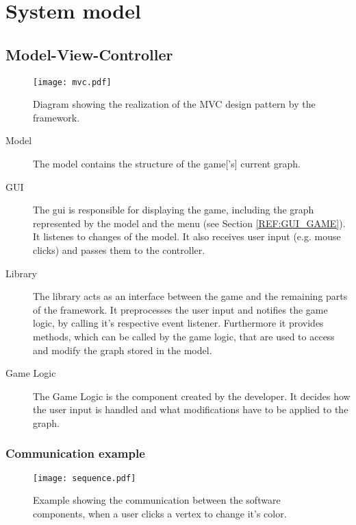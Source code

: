 \section{System model}

\subsection{Model-View-Controller}


\begin{figure}[h]
	\centering
	\texttt{[image: mvc.pdf]}
	\caption{Diagram showing the realization of the \gls{MVC} design pattern by the framework.}
	\label{img:MVC}
\end{figure}

\begin{description}
\item[Model] The model contains the structure of the \gls{game}['s] current \gls{graph}.
\item[GUI] The \gls{gui} is responsible for displaying the game, including the \gls{graph} represented by the model and the menu (see Section \ref{REF:GUI_GAME}). It listenes to changes of the model. It also receives user input (e.g. mouse clicks) and passes them to the controller.
\item[Library] The library acts as an interface between the game and the remaining parts of the framework. It preprocesses the user input and notifies the game logic, by calling it's respective event listener. Furthermore it provides methods, which can be called by the game logic, that are used to access and modify the \gls{graph} stored in the model.
\item[Game Logic] The Game Logic is the component created by the \gls{developer}. It decides how the user input is handled and what modifications have to be applied to the \gls{graph}. 
\end{description}

\subsubsection{Communication example}
\begin{figure}[h!]
	\centering
	\texttt{[image: sequence.pdf]}
	\caption{Example showing the communication between the software components, when a user clicks a vertex to change it's color.}
	\label{img:SEQ}
\end{figure}
